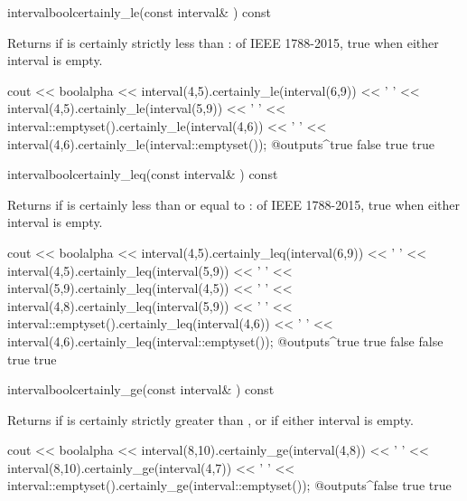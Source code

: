 \documentclass[12pt,a4paper,twoside,openright]{book}
\begin{document}
\begin{defmethod}{interval}{bool}{certainly\_le}{(const interval\& ) const}
  \begin{operation}
  \end{operation}
  Returns  if  is certainly strictly less than
  :  of IEEE 1788-2015, true when either
  interval is empty.\newinvfive
  \begin{example}
cout << boolalpha << interval(4,5).certainly_le(interval(6,9)) << ' '
     << interval(4,5).certainly_le(interval(5,9)) << ' '
     << interval::emptyset().certainly_le(interval(4,6)) << ' '
     << interval(4,6).certainly_le(interval::emptyset());
@outputs^true false true true~
  \end{example}
\end{defmethod}

\begin{defmethod}{interval}{bool}{certainly\_leq}{(const interval\& ) const}
  \begin{operation}
  \end{operation}
  Returns  if  is certainly less than or equal to
  :  of IEEE 1788-2015, true when either interval is
  empty.\newinvfive
  \begin{example}
cout << boolalpha << interval(4,5).certainly_leq(interval(6,9)) << ' '
     << interval(4,5).certainly_leq(interval(5,9)) << ' '
     << interval(5,9).certainly_leq(interval(4,5)) << ' '
     << interval(4,8).certainly_leq(interval(5,9)) << ' '
     << interval::emptyset().certainly_leq(interval(4,6)) << ' '
     << interval(4,6).certainly_leq(interval::emptyset());
@outputs^true true false false true true~
\end{example}
\end{defmethod}

\begin{defmethod}{interval}{bool}{certainly\_ge}{(const interval\& ) const}
  \begin{operation}
  \end{operation}
  Returns  if  is certainly strictly greater than
  , or if either interval is empty.
  \begin{example}
cout << boolalpha << interval(8,10).certainly_ge(interval(4,8)) << ' '
     << interval(8,10).certainly_ge(interval(4,7)) << ' '
     << interval::emptyset().certainly_ge(interval::emptyset());
@outputs^false true true~
  \end{example}
\end{defmethod}
\end{document}
